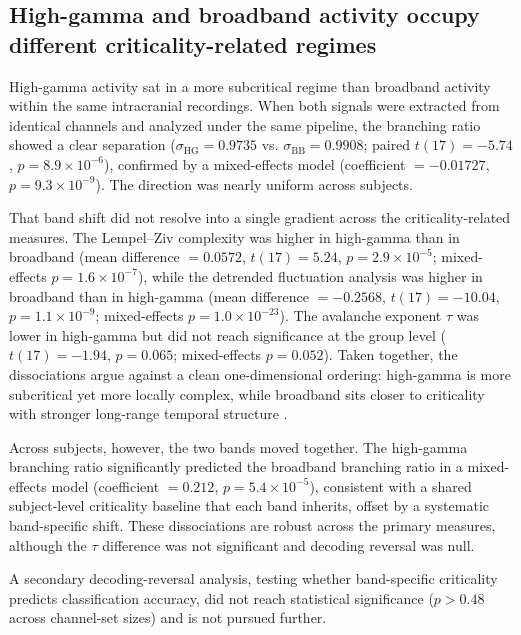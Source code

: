 \documentclass[preprint,12pt,nonatbib]{elsarticle}
\begin{document}
\subsection{High-gamma and broadband activity occupy different criticality-related regimes}
High-gamma activity sat in a more subcritical regime than broadband activity within the same intracranial recordings. When both signals were extracted from identical channels and analyzed under the same pipeline, the branching ratio showed a clear separation ($\sigma_{\mathrm{HG}} = 0.9735$ vs. $\sigma_{\mathrm{BB}} = 0.9908$; paired $t(17) = -5.74$, $p = 8.9 \times 10^{-6}$), confirmed by a mixed-effects model (coefficient $= -0.01727$, $p = 9.3 \times 10^{-9}$). The direction was nearly uniform across subjects.

That band shift did not resolve into a single gradient across the criticality-related measures. The Lempel--Ziv complexity was higher in high-gamma than in broadband (mean difference $= 0.0572$, $t(17) = 5.24$, $p = 2.9 \times 10^{-5}$; mixed-effects $p = 1.6 \times 10^{-7}$), while the detrended fluctuation analysis was higher in broadband than in high-gamma (mean difference $= -0.2568$, $t(17) = -10.04$, $p = 1.1 \times 10^{-9}$; mixed-effects $p = 1.0 \times 10^{-23}$). The avalanche exponent $\tau$ was lower in high-gamma but did not reach significance at the group level ($t(17) = -1.94$, $p = 0.065$; mixed-effects $p = 0.052$). Taken together, the dissociations argue against a clean one-dimensional ordering: high-gamma is more subcritical yet more locally complex, while broadband sits closer to criticality with stronger long-range temporal structure \citep{Grubov2025}.

Across subjects, however, the two bands moved together. The high-gamma branching ratio significantly predicted the broadband branching ratio in a mixed-effects model (coefficient $= 0.212$, $p = 5.4 \times 10^{-5}$), consistent with a shared subject-level criticality baseline that each band inherits, offset by a systematic band-specific shift. These dissociations are robust across the primary measures, although the $\tau$ difference was not significant and decoding reversal was null.

A secondary decoding-reversal analysis, testing whether band-specific criticality predicts classification accuracy, did not reach statistical significance ($p > 0.48$ across channel-set sizes) and is not pursued further.
\end{document}
